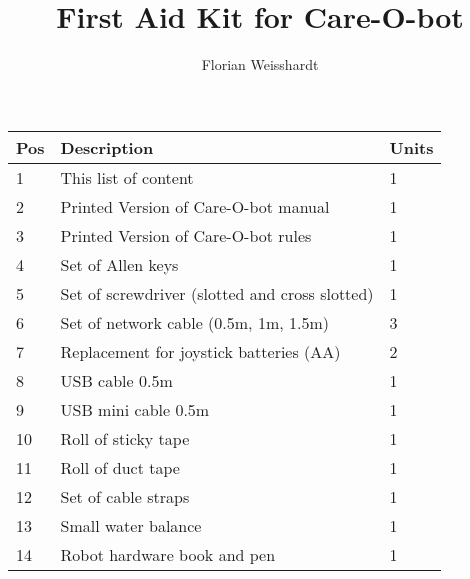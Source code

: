 \documentclass{article}
\title{First Aid Kit for Care-O-bot} %
\author{Florian Weisshardt} %
\begin{document}
\maketitle %

\begin{tabular}{|l|l|l|}
\hline
\textbf{Pos} & \textbf{Description} & \textbf{Units}\\
\hline\hline
1 & This list of content & 1\\
2 & Printed Version of Care-O-bot manual & 1\\
3 & Printed Version of Care-O-bot rules & 1\\
4 & Set of Allen keys & 1\\
5 & Set of screwdriver (slotted and cross slotted) & 1\\
6 & Set of network cable (0.5m, 1m, 1.5m) & 3\\
7 & Replacement for joystick batteries (AA) & 2\\
8 & USB cable 0.5m & 1\\
9 & USB mini cable 0.5m & 1\\
10 & Roll of sticky tape & 1\\
11 & Roll of duct tape & 1\\
12 & Set of cable straps & 1\\
13 & Small water balance & 1\\
14 & Robot hardware book and pen & 1\\
\hline
\end{tabular}
\end{document}
